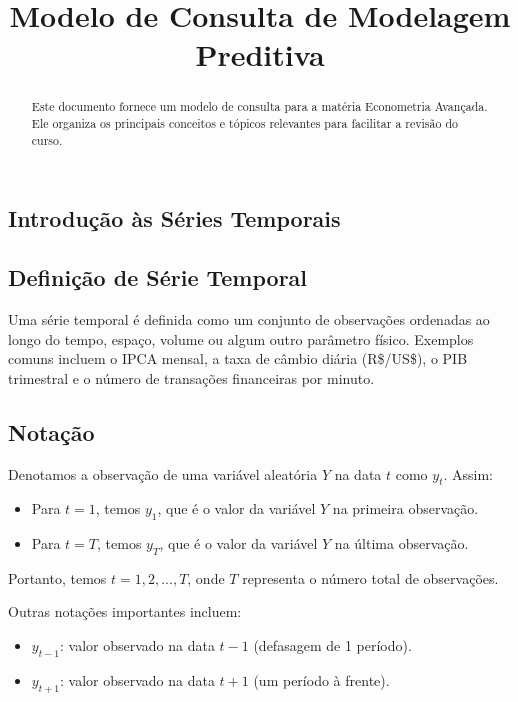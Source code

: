 \documentclass{sciposter}
\title{Modelo de Consulta de Modelagem Preditiva}
\institute 
{Bacharelado em Economia\\
Insper - Instituto de Ensino e Pesquisa\\
São Paulo, Brasil}
\begin{document}

\maketitle

\begin{multicols}{3}

\begin{abstract}
Este documento fornece um modelo de consulta para a matéria Econometria Avançada. Ele organiza os principais conceitos e tópicos relevantes para facilitar a revisão do curso.
\end{abstract}

\section{\textbf{Introdução às Séries Temporais}}

\subsection{Definição de Série Temporal}

Uma série temporal é definida como um conjunto de observações ordenadas ao longo do tempo, espaço, volume ou algum outro parâmetro físico. Exemplos comuns incluem o IPCA mensal, a taxa de câmbio diária (R\$/US\$), o PIB trimestral e o número de transações financeiras por minuto.

\subsection{Notação}
Denotamos a observação de uma variável aleatória $Y$ na data $t$ como $y_t$. Assim:
\begin{itemize}
    \item Para $t = 1$, temos $y_1$, que é o valor da variável $Y$ na primeira observação.
    \item Para $t = T$, temos $y_T$, que é o valor da variável $Y$ na última observação.
\end{itemize}
Portanto, temos $t = 1, 2, ..., T$, onde $T$ representa o número total de observações. 

Outras notações importantes incluem:
\begin{itemize}
    \item $y_{t-1}$: valor observado na data $t-1$ (defasagem de 1 período).
    \item $y_{t+1}$: valor observado na data $t+1$ (um período à frente).
\end{itemize}


\end{multicols}
\end{document}
